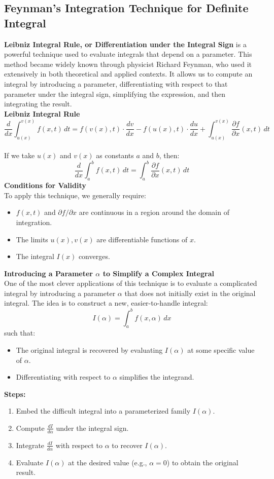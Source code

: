\documentclass[11pt]{article}
\begin{document}
\subsection{Feynman's Integration Technique for Definite Integral}
\textbf{Leibniz Integral Rule, or Differentiation under the Integral Sign} is a powerful technique used to evaluate integrals that depend on a parameter. This method became widely known through physicist Richard Feynman, who used it extensively in both theoretical and applied contexts.
It allows us to compute an integral by introducing a parameter, differentiating with respect to that parameter under the integral sign, simplifying the expression, and then integrating the result.\\[.5em]
\textbf{Leibniz Integral Rule}
\[
    \frac{d}{dx} \int_{u(x)}^{v(x)} f(x, t) \, dt
    = f(v(x), t) \cdot \frac{dv}{dx} - f(u(x), t) \cdot \frac{du}{dx} 
    + \int_{u(x)}^{v(x)} \frac{\partial f}{\partial x}(x, t) \, dt
\]\\[.5em]
If we take $u(x)$ and $v(x)$ as constants $a$ and $b$, then:
\[
    \frac{d}{dx} \int_a^b f(x, t) \, dt = \int_a^b \frac{\partial f}{\partial x}(x, t) \, dt
\]
\textbf{Conditions for Validity}\\
To apply this technique, we generally require:
\begin{itemize}
    \item $f(x, t)$ and $\partial f / \partial x$ are continuous in a region around the domain of integration.
    \item The limits $u(x), v(x)$ are differentiable functions of $x$.
    \item The integral $I(x)$ converges.
\end{itemize}
\textbf{Introducing a Parameter $\alpha$ to Simplify a Complex Integral}\\
One of the most clever applications of this technique is to evaluate a complicated integral by introducing a parameter \(\alpha\) that does not initially exist in the original integral. The idea is to construct a new, easier-to-handle integral:
\[
    I(\alpha) = \int_{a}^{b} f(x, \alpha) \, dx
\]
such that:
\begin{itemize}
    \item The original integral is recovered by evaluating $I(\alpha)$ at some specific value of \(\alpha\).
    \item Differentiating with respect to $\alpha$ simplifies the integrand.
\end{itemize}
\textbf{Steps:}
\begin{enumerate}
    \item Embed the difficult integral into a parameterized family $I(\alpha)$.
    \item Compute $\displaystyle\frac{dI}{d\alpha}$ under the integral sign.
    \item Integrate $\displaystyle\frac{dI}{d\alpha}$ with respect to $\alpha$ to recover $I(\alpha)$.
    \item Evaluate $I(\alpha)$ at the desired value (e.g., $\alpha = 0$) to obtain the original result.
\end{enumerate}
\end{document}
